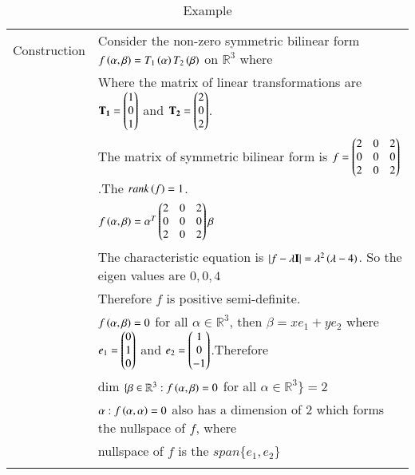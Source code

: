 \begin{longtable}{|l|l|}
    \hline
    Construction &Consider the non-zero symmetric bilinear form $f\left(\alpha,\beta\right)=T_1\left(\alpha\right)T_2\left(\beta\right)$ on $\mathbb{R}^3$ where\\
    &Where the matrix of linear transformations are $\mathbf{T_1}=\begin{pmatrix}1\\0\\1\end{pmatrix}$ and $\mathbf{T_2}=\begin{pmatrix}2\\0\\2\end{pmatrix}$.\\
    &The matrix of symmetric bilinear form is $f=\begin{pmatrix}2&0&2\\0&0&0\\2&0&2\end{pmatrix}$.The $rank\left(f\right)=1$.\\
    &$f\left(\alpha,\beta\right)=\alpha^T\begin{pmatrix}2&0&2\\0&0&0\\2&0&2\end{pmatrix}\beta$\\
    &The characteristic equation is  $\left\vert f-\lambda\mathbf{I}\right\vert=\lambda^2\left(\lambda-4\right)$. So the eigen values are $0,0,4$\\
    \hline
    &Therefore $f$ is positive semi-definite.\\
    &$f\left(\alpha,\beta\right)=0$ for all $\alpha\in\mathbb{R}^3$, then $\beta=xe_1+ye_2$ where $e_1=\begin{pmatrix}0\\1\\0\end{pmatrix}$ and $e_2=\begin{pmatrix}1\\0\\-1\end{pmatrix}$.Therefore\\
    &dim $\{\beta\in\mathbb{R}^3:f\left(\alpha,\beta\right)=0$ for all $\alpha\in\mathbb{R}^3\}=2$\\
    &$\alpha:f\left(\alpha,\alpha\right)=0$ also has a dimension of 2 which forms the nullspace of $f$, where \\
    &nullspace of $f$ is the $span\{e_1,e_2\}$\\ 
    \hline
    \caption{Example}
    \label{eq:solutions/2014/dec/73/tab:example}
\end{longtable}
\twocolumn
